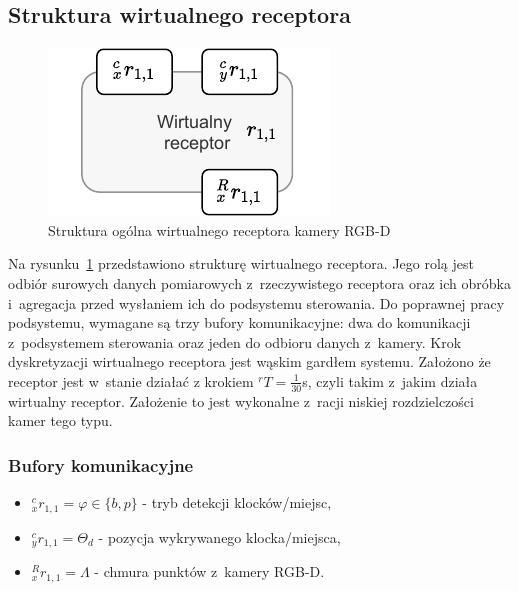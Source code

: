 \subsection{Struktura wirtualnego receptora}
\label{subsec:vr-camera-struktura}

\begin{figure}[ht]
    \centering
    \includegraphics[width=0.75\columnwidth]{figures/ISR-vr-camera-model.pdf}
    \caption{Struktura ogólna wirtualnego receptora kamery RGB-D}
    \label{fig:model-vr-camera}
\end{figure}

Na rysunku~\ref{fig:model-vr-camera} przedstawiono strukturę wirtualnego receptora. Jego rolą jest odbiór surowych danych pomiarowych z~rzeczywistego receptora oraz ich obróbka i~agregacja przed wysłaniem ich do podsystemu sterowania. Do poprawnej pracy podsystemu, wymagane są trzy bufory komunikacyjne: dwa do komunikacji z~podsystemem sterowania oraz jeden do odbioru danych z~kamery. Krok dyskretyzacji wirtualnego receptora jest wąskim gardłem systemu. Założono że receptor jest w~stanie działać z krokiem ${}^{r}T = \frac{1}{30}$s, czyli takim z~jakim działa wirtualny receptor. Założenie to jest wykonalne z~racji niskiej rozdzielczości kamer tego typu.

\subsubsection{Bufory komunikacyjne}
\begin{itemize}
    \item ${}^{c}_{x}r_{1,1} = \varphi \in \{b, p\}$ - tryb detekcji klocków/miejsc,
    \item ${}^{c}_{y}r_{1,1} = \Theta_{d}$ - pozycja wykrywanego klocka/miejsca,
    \item ${}^{R}_{x}r_{1,1} = \Lambda$ - chmura punktów z~kamery RGB-D.
\end{itemize}

